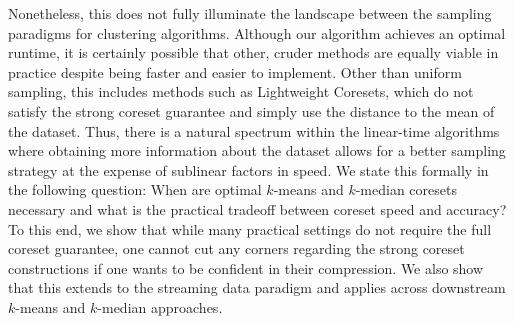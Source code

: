 Nonetheless, this does not fully illuminate the landscape between the sampling paradigms for clustering algorithms. Although our algorithm achieves an optimal
runtime, it is certainly possible that other, cruder methods are equally viable in practice despite being faster and easier to implement. Other than uniform
sampling, this includes methods such as Lightweight Coresets, which do not satisfy the strong coreset guarantee and simply use the distance to the mean
of the dataset. Thus, there is a natural spectrum within the linear-time algorithms where obtaining more information about the dataset allows for a better
sampling strategy at the expense of sublinear factors in speed. We state this formally in the following question: When are optimal $k$-means and $k$-median
coresets necessary and what is the practical tradeoff between coreset speed and accuracy? To this end, we show that while many practical settings do not require
the full coreset guarantee, one cannot cut any corners regarding the strong coreset constructions if one wants to be confident in their compression. We also
show that this extends to the streaming data paradigm and applies across downstream $k$-means and $k$-median approaches.
